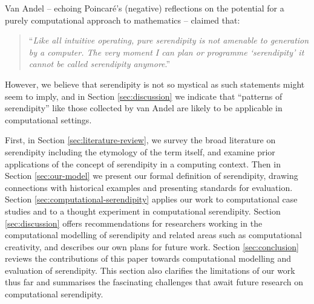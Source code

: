 Van Andel \citeyear{van1994anatomy} -- echoing Poincar\'e's
\citeyear{poincare1910creation} (negative) reflections on the potential
for a purely computational approach to mathematics -- claimed that:
\begin{quote}
``\emph{Like all intuitive operating, pure serendipity is not amenable
    to generation by a computer.  The very moment I can plan or
    programme `serendipity' it cannot be called serendipity
    anymore}.'' \cite{van1994anatomy}
\end{quote}
However, we believe that serendipity is not so mystical as such statements
might seem to imply, and in Section \ref{sec:discussion} we indicate
that ``patterns of serendipity'' like those collected by van Andel
are likely to be applicable in computational settings.

First, in
Section \ref{sec:literature-review}, we survey the broad literature on
serendipity including the etymology of the term itself, and examine prior applications of the concept of serendipity in a computing context.  Then in Section \ref{sec:our-model} we present our formal
definition of serendipity, drawing connections with historical examples 
and presenting standards for evaluation.  Section
\ref{sec:computational-serendipity} applies our work to computational case studies and
to a thought experiment in computational serendipity.  Section
\ref{sec:discussion} offers recommendations for researchers working in the computational modelling of serendipity and related areas such as computational creativity, and describes our own plans for future
work.  Section \ref{sec:conclusion} reviews the contributions of this paper towards computational modelling and evaluation of serendipity.  This section also clarifies the limitations of our work thus far and summarises the fascinating challenges that await future research on computational serendipity.


